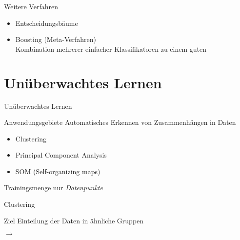 \documentclass[xcolor={dvipsnames,svgnames},draft]{beamer}
\begin{document}
\begin{frame}{Weitere Verfahren}

  \begin{itemize}
  \item Entscheidungsbäume
  \item Boosting (Meta-Verfahren) \\
    Kombination mehrerer einfacher Klassifikatoren zu einem guten
  \end{itemize}

\end{frame}

\section{Unüberwachtes Lernen}

\begin{frame}{Unüberwachtes Lernen}
  \begin{exampleblock}{Anwendungsgebiete}
    Automatisches Erkennen von Zusammenhängen in Daten
    \begin{itemize}
    \item Clustering
    \item Principal Component Analysis
    \item SOM (Self-organizing maps)
    \end{itemize}
  \end{exampleblock}

  \begin{block}{Trainingsmenge}
    nur \textit{Datenpunkte}
  \end{block}
\end{frame}

\begin{frame}{Clustering}
  \begin{block}{Ziel}
    Einteilung der Daten in ähnliche Gruppen
  \end{block}

  
  \centering
  \begin{minipage}{0.4\linewidth}
  \end{minipage}
  \quad$\rightarrow$\quad
  \begin{minipage}{0.4\linewidth}
  \end{minipage}
\end{frame}
\end{document}
